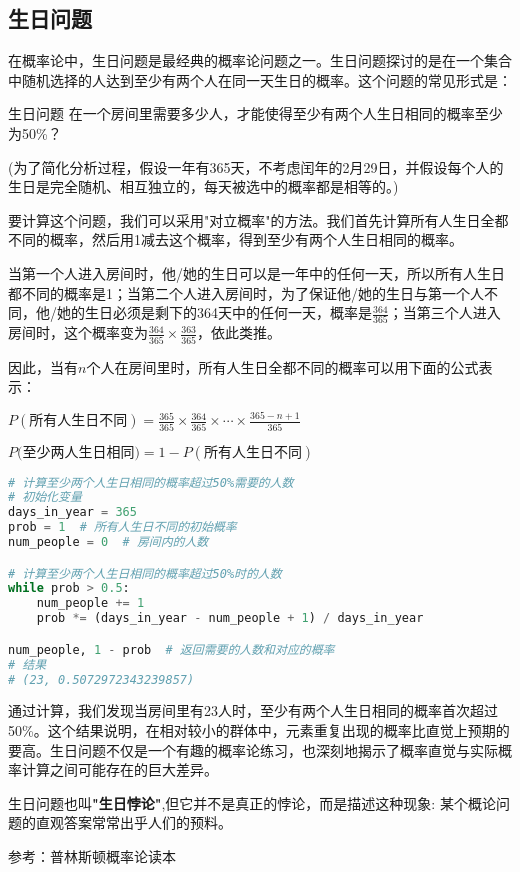 
\begin{issues}
\issueDraft
\end{issues}

\subsection{生日问题}

在概率论中，生日问题是最经典的概率论问题之一。生日问题探讨的是在一个集合中随机选择的人达到至少有两个人在同一天生日的概率。这个问题的常见形式是：

\begin{example}{生日问题}
在一个房间里需要多少人，才能使得至少有两个人生日相同的概率至少为50\%？

(为了简化分析过程，假设一年有365天，不考虑闰年的2月29日，并假设每个人的生日是完全随机、相互独立的，每天被选中的概率都是相等的。)
\end{example}

要计算这个问题，我们可以采用"对立概率"的方法。我们首先计算所有人生日全都不同的概率，然后用1减去这个概率，得到至少有两个人生日相同的概率。

当第一个人进入房间时，他/她的生日可以是一年中的任何一天，所以所有人生日都不同的概率是1；当第二个人进入房间时，为了保证他/她的生日与第一个人不同，他/她的生日必须是剩下的364天中的任何一天，概率是$\frac{364}{365}$；当第三个人进入房间时，这个概率变为$\frac{364}{365} \times \frac{363}{365}$，依此类推。

因此，当有$n$个人在房间里时，所有人生日全都不同的概率可以用下面的公式表示：

$
P(\text{所有人生日不同}) = \frac{365}{365} \times \frac{364}{365} \times \cdots \times \frac{365-n+1}{365}
$

$P(\text{至少两人生日相同)} = 1-P(\text{所有人生日不同})$


\begin{lstlisting}[language=python]
# 计算至少两个人生日相同的概率超过50%需要的人数
# 初始化变量
days_in_year = 365
prob = 1  # 所有人生日不同的初始概率
num_people = 0  # 房间内的人数

# 计算至少两个人生日相同的概率超过50%时的人数
while prob > 0.5:
    num_people += 1
    prob *= (days_in_year - num_people + 1) / days_in_year

num_people, 1 - prob  # 返回需要的人数和对应的概率
# 结果 
# (23, 0.5072972343239857)
\end{lstlisting}

通过计算，我们发现当房间里有23人时，至少有两个人生日相同的概率首次超过50\%。这个结果说明，在相对较小的群体中，元素重复出现的概率比直觉上预期的要高。生日问题不仅是一个有趣的概率论练习，也深刻地揭示了概率直觉与实际概率计算之间可能存在的巨大差异。


生日问题也叫\textbf{"生日悖论"},但它并不是真正的悖论，而是描述这种现象: 某个概论问题的直观答案常常出乎人们的预料。



参考：普林斯顿概率论读本